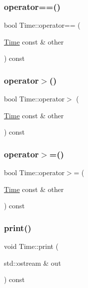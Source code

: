 \mbox{\label{classTime_a682cdf808ba44f29b2e33ed257906a10}} 
\subsubsection{\texorpdfstring{operator==()}{operator==()}}
{\footnotesize\ttfamily bool Time\+::operator== (\begin{DoxyParamCaption}\item[{\hyperlink{classTime}{Time} const \&}]{other }\end{DoxyParamCaption}) const}

\mbox{\label{classTime_a6d544b6af2fd13223a5436d34964fe3a}} 
\subsubsection{\texorpdfstring{operator$>$()}{operator>()}}
{\footnotesize\ttfamily bool Time\+::operator$>$ (\begin{DoxyParamCaption}\item[{\hyperlink{classTime}{Time} const \&}]{other }\end{DoxyParamCaption}) const}

\mbox{\label{classTime_a1f7d030e8a6095b0bcd41bf4c5db3719}} 
\subsubsection{\texorpdfstring{operator$>$=()}{operator>=()}}
{\footnotesize\ttfamily bool Time\+::operator$>$= (\begin{DoxyParamCaption}\item[{\hyperlink{classTime}{Time} const \&}]{other }\end{DoxyParamCaption}) const}

\mbox{\label{classTime_a2596ef53ebb188dc75b88160bd0aa230}} 
\subsubsection{\texorpdfstring{print()}{print()}}
{\footnotesize\ttfamily void Time\+::print (\begin{DoxyParamCaption}\item[{std\+::ostream \&}]{out }\end{DoxyParamCaption}) const}

